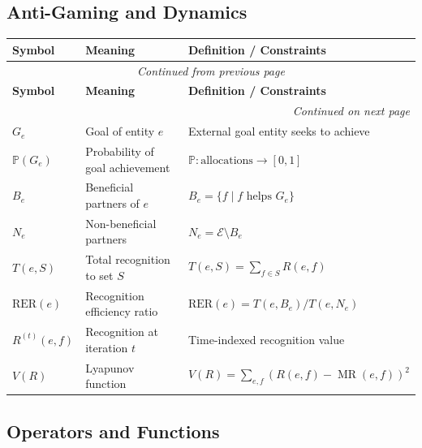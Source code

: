 \documentclass[11pt,a4paper]{article}
\theoremstyle{definition}
\theoremstyle{remark}
\newcommand{\E}{\mathcal{E}}
\DeclareMathOperator{\MR}{MR}
\begin{document}
\subsection{Anti-Gaming and Dynamics}

\begin{longtable}{lll}
\toprule
\textbf{Symbol} & \textbf{Meaning} & \textbf{Definition / Constraints} \\
\midrule
\endfirsthead
\multicolumn{3}{c}{\textit{Continued from previous page}} \\
\toprule
\textbf{Symbol} & \textbf{Meaning} & \textbf{Definition / Constraints} \\
\midrule
\endhead
\midrule
\multicolumn{3}{r}{\textit{Continued on next page}} \\
\endfoot
\bottomrule
\endlastfoot
$G_e$ & Goal of entity $e$ & External goal entity seeks to achieve \\
$\mathbb{P}(G_e)$ & Probability of goal achievement & $\mathbb{P}: \text{allocations} \rightarrow [0,1]$ \\
$B_e$ & Beneficial partners of $e$ & $B_e = \{f \mid f \text{ helps } G_e\}$ \\
$N_e$ & Non-beneficial partners & $N_e = \E \setminus B_e$ \\
$T(e,S)$ & Total recognition to set $S$ & $T(e,S) = \sum_{f \in S} R(e,f)$ \\
$\text{RER}(e)$ & Recognition efficiency ratio & $\text{RER}(e) = T(e,B_e) / T(e,N_e)$ \\
$R^{(t)}(e,f)$ & Recognition at iteration $t$ & Time-indexed recognition value \\
$V(R)$ & Lyapunov function & $V(R) = \sum_{e,f} (R(e,f) - \MR(e,f))^2$ \\
\end{longtable}

\subsection{Operators and Functions}
\end{document}
